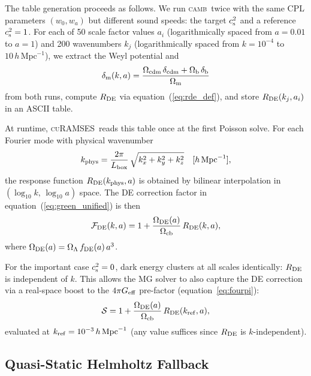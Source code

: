 \documentclass[fleqn,usenatbib]{mnras}
\newcommand{\curamses}{\textsc{cuRAMSES}}
\newcommand{\camb}{\textsc{camb}}
\newcommand{\Ocb}{\Omega_{\rm cb}}
\newcommand{\Om}{\Omega_{\rm m}}
\newcommand{\Ol}{\Omega_\Lambda}
\newcommand{\Ode}{\Omega_{\rm DE}}
\newcommand{\Rde}{R_{\rm DE}}
\newcommand{\cst}{c_{\rm s}^2}
\begin{document}
The table generation proceeds as follows.  We run \camb\ twice with
the same CPL parameters $(w_0, w_a)$ but different sound speeds:
the target $\cst$ and a reference $\cst=1$.  For each of 50 scale
factor values $a_i$ (logarithmically spaced from $a=0.01$ to $a=1$)
and 200 wavenumbers $k_j$ (logarithmically spaced from $k=10^{-4}$
to $10\,h\,\mathrm{Mpc}^{-1}$), we extract the Weyl potential and
\begin{equation}
\delta_{\rm m}(k,a) = \frac{\Omega_{\rm cdm}\,\delta_{\rm cdm}
  + \Omega_{\rm b}\,\delta_{\rm b}}{\Om}
\label{eq:delta_m}
\end{equation}
from both runs, compute $\Rde$ via equation~(\ref{eq:rde_def}), and
store $\Rde(k_j, a_i)$ in an ASCII table.

At runtime, \curamses\ reads this table once at the first Poisson
solve.  For each Fourier mode with physical wavenumber
\begin{equation}
k_{\rm phys} = \frac{2\pi}{L_{\rm box}}\,
\sqrt{k_x^2 + k_y^2 + k_z^2}
\quad [h\,\mathrm{Mpc}^{-1}],
\label{eq:kphys}
\end{equation}
the response function $\Rde(k_{\rm phys}, a)$ is obtained by bilinear
interpolation in $(\log_{10}k,\,\log_{10}a)$ space.  The DE correction
factor in equation~(\ref{eq:green_unified}) is then
\begin{equation}
\mathcal{F}_{\rm DE}(k,a)
  = 1 + \frac{\Ode(a)}{\Ocb}\,\Rde(k,a),
\label{eq:de_factor}
\end{equation}
where $\Ode(a) = \Ol\,f_{\rm DE}(a)\,a^3$.

For the important case $\cst = 0$, dark energy clusters at all scales
identically: $\Rde$ is independent of $k$.  This allows the MG solver
to also capture the DE correction via a real-space boost to the
$4\pi G_{\rm eff}$ pre-factor (equation~\ref{eq:fourpi}):
\begin{equation}
\mathcal{S} = 1 + \frac{\Ode(a)}{\Ocb}\,\Rde(k_{\rm ref},a),
\label{eq:fourpi_boost}
\end{equation}
evaluated at $k_{\rm ref} = 10^{-3}\,h\,\mathrm{Mpc}^{-1}$ (any
value suffices since $\Rde$ is $k$-independent).

\subsection{Quasi-Static Helmholtz Fallback}
\label{sec:de_helmholtz}
\end{document}
